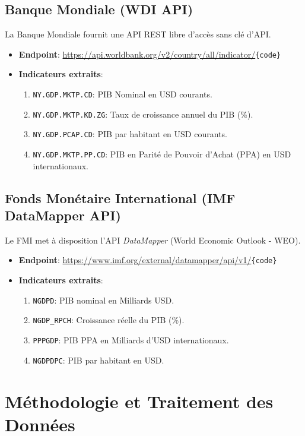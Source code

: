 \documentclass[11pt,a4paper]{article}
\begin{document}
\subsection{Banque Mondiale (WDI API)}
La Banque Mondiale fournit une API REST libre d'accès sans clé d'API.
\begin{itemize}
    \item \textbf{Endpoint}: \url{https://api.worldbank.org/v2/country/all/indicator/}\texttt{\{code\}}
    \item \textbf{Indicateurs extraits}:
    \begin{enumerate}
        \item \texttt{NY.GDP.MKTP.CD}: PIB Nominal en USD courants.
        \item \texttt{NY.GDP.MKTP.KD.ZG}: Taux de croissance annuel du PIB (\%).
        \item \texttt{NY.GDP.PCAP.CD}: PIB par habitant en USD courants.
        \item \texttt{NY.GDP.MKTP.PP.CD}: PIB en Parité de Pouvoir d'Achat (PPA) en USD internationaux.
    \end{enumerate}
\end{itemize}

\subsection{Fonds Monétaire International (IMF DataMapper API)}
Le FMI met à disposition l'API \textit{DataMapper} (World Economic Outlook - WEO).
\begin{itemize}
    \item \textbf{Endpoint}: \url{https://www.imf.org/external/datamapper/api/v1/}\texttt{\{code\}}
    \item \textbf{Indicateurs extraits}:
    \begin{enumerate}
        \item \texttt{NGDPD}: PIB nominal en Milliards USD.
        \item \texttt{NGDP\_RPCH}: Croissance réelle du PIB (\%).
        \item \texttt{PPPGDP}: PIB PPA en Milliards d'USD internationaux.
        \item \texttt{NGDPDPC}: PIB par habitant en USD.
    \end{enumerate}
\end{itemize}

\section{Méthodologie et Traitement des Données}
\end{document}
